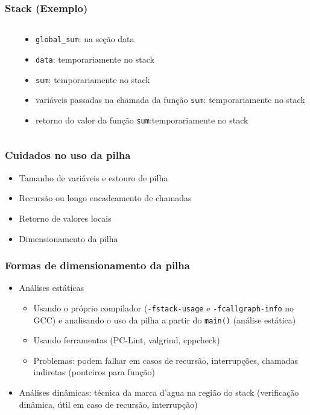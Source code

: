 \documentclass{beamer}
\begin{document}
\begin{frame}
	\frametitle{Stack (Exemplo)}
	\begin{columns}[T] %
	\begin{column}{.55\textwidth}
		
	\end{column}%
	\hfill%
	\begin{column}{.45\textwidth}
    {\footnotesize
	\begin{itemize}
	\item \texttt{global\_sum}: na seção data
    \item \texttt{data}: temporariamente no stack
    \item \texttt{sum}: temporariamente no stack
    \item variáveis passadas na chamada da função \texttt{sum}: temporariamente no stack
    \item retorno do valor da função \texttt{sum}:temporariamente  no stack
	\end{itemize}
    }
	\end{column}%
\end{columns}
\end{frame}

\begin{frame}
	\frametitle{Cuidados no uso da pilha}
	\begin{itemize}
	\item Tamanho de variáveis e estouro de pilha
	\item Recursão ou longo encadeamento de chamadas
	\item Retorno de valores locais
	\item Dimensionamento da pilha
	\end{itemize}
\end{frame}

\begin{frame}
	\frametitle{Formas de dimensionamento da pilha}
	\begin{itemize}
		\item Análises estáticas
		\begin{itemize}
			\item Usando o próprio compilador (\texttt{-fstack-usage} e \texttt{-fcallgraph-info} no GCC) e analisando o uso da pilha a partir do \texttt{main()} (análise estática)
			\item Usando ferramentas (PC-Lint, valgrind, cppcheck)
			\item Problemas: podem falhar em casos de recursão, interrupções, chamadas indiretas (ponteiros para função)
		\end{itemize}
		\item Análises dinâmicas: técnica da marca d'agua na região do stack (verificação dinâmica, útil em caso de recursão, interrupção)
		\end{itemize}
\end{frame}
\end{document}
